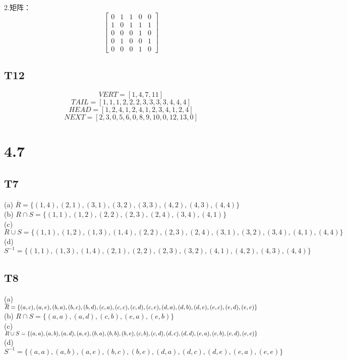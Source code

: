 \documentclass{article}
\begin{document}
2.矩阵：
$$
\begin{bmatrix}
    0 & 1 & 1 & 0 & 0\\
    1 & 0 & 1 & 1 & 1\\
    0 & 0 & 0 & 1 & 0\\
    0 & 1 & 0 & 0 & 1\\
    0 & 0 & 0 & 1 & 0
\end{bmatrix}
$$
\subsection{T12}
$$VERT = [1, 4, 7, 11]$$
$$TAIL = [1, 1, 1, 2, 2, 2, 3, 3, 3, 3, 4, 4, 4]$$
$$HEAD = [1, 2, 4, 1, 2, 4, 1, 2, 3, 4, 1, 2, 4]$$
$$NEXT = [2, 3, 0, 5, 6, 0, 8, 9, 10, 0, 12, 13, 0]$$
\section{4.7}
\subsection{T7}
(a) $\overline{R} = \{(1, 4), (2, 1), (3, 1), (3, 2), (3, 3), (4, 2), (4, 3), (4, 4)\}$\\
(b) $R \cap S = \{(1, 1), (1, 2), (2, 2), (2, 3), (2, 4), (3, 4), (4, 1)\}$\\
(c) $R \cup S = \{(1, 1), (1, 2), (1, 3), (1, 4), (2, 2), (2, 3), (2, 4), (3, 1), (3, 2), (3, 4), (4, 1), (4, 4)\}$\\
(d) $S^{-1} = \{(1, 1), (1, 3), (1, 4), (2, 1), (2, 2), (2, 3), (3, 2), (4, 1), (4, 2), (4, 3), (4, 4)\}$  
\subsection{T8}
(a) $\overline{R} = \{(a, c), (a, e), (b, a), (b, c), (b, d), (c, a), (c, c), (c, d), (c, e), (d, a), (d, b),\\
(d, e), (e, c), (e, d), (e, e)\}$\\
(b) $R \cap S = \{(a, a), (a, d), (c, b), (e, a), (e, b)\}$\\
(c) $R \cup S = \{(a, a), (a, b), (a, d), (a, e), (b, a), (b, b), (b, e), (c, b), (c, d), (d, c), (d, d),\\
(e, a), (e, b), (e, d), (e, e)\}$\\
(d) $S^{-1} = \{(a, a), (a, b), (a, e), (b, c), (b, e), (d, a), (d, c), (d, e), (e, a), (e, e)\}$
\end{document}
